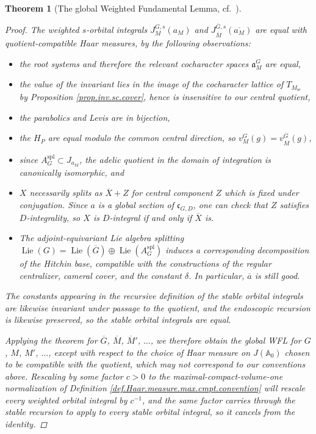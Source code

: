 \documentclass[openany]{amsbook}
\newtheorem{theorem}{Theorem}[chapter]
\theoremstyle{definition}
\theoremstyle{remark}
\numberwithin{equation}{section}
\newcommand{\A}{\mathbb{A}}
\newcommand{\ol}[1]{\overline{#1}}
\renewcommand{\-}{\operatorname{-}}
\renewcommand{\a}{\mathfrak{a}}
\newcommand{\on}[1]{\operatorname{#1}}
\renewcommand{\A}{\mathbb{A}}
\newcommand{\fc}{\mathfrak{c}}
\newcommand{\Lie}{\on{Lie}}
\newcommand{\spl}{\mathrm{spl}}
\renewcommand{\sc}{\mathrm{sc}}
\begin{document}
\begin{theorem}[{The global Weighted Fundamental Lemma, cf.\ \cite[Th\'eor\`eme 15.1.1]{CLII}}]
\begin{proof}
    The weighted $s$-orbital integrals $J^{G,s}_M(a_M)$ and $J^{\ol{G},s}_{\ol{M}}(\ol{a_M})$ are equal with quotient-compatible Haar measures, by the following observations: 
    \begin{itemize} 
    \item the root systems and therefore the relevant cocharacter spaces $\a_M^G$ are equal, 
    \item the value of the invariant lies in the image of the cocharacter lattice of $T_{M_{\sc}}$ by Proposition \ref{prop.inv.sc.cover}, hence is insensitive to our central quotient,
    \item the parabolics and Levis are in bijection, 
    \item the $H_P$ are equal modulo the common central direction, so $v_M^G(g) = v_{\ol{M}}^{\ol{G}}(g)$,
    \item since $A_G^{\spl} \subset J_{a_M}$, the adelic quotient in the domain of integration is canonically isomorphic, and
    \item $X$ necessarily splits as $\ol{X} + Z$ for central component $Z$ which is fixed under conjugation. Since $a$ is a global section of $\fc_{G,D}$, one can check that $Z$ satisfies $D$-integrality, so $X$ is $D$-integral if and only if $\ol{X}$ is.
    \item The adjoint-equivariant Lie algebra splitting $\Lie(G) = \Lie(\ol{G}) \oplus \Lie(A_G^{\spl})$ induces a corresponding decomposition of the Hitchin base, compatible with the constructions of the regular centralizer, cameral cover, and the constant $\delta$. In particular, $\ol{a}$ is still good. 
    \end{itemize}
    The constants appearing in the recursive definition of the stable orbital integrals are likewise invariant under passage to the quotient, and the endoscopic recursion is likewise preserved, so the stable orbital integrals are equal. 
    
    Applying the theorem for $\ol{G}$, $\ol{M}$, $\ol{M}'$, $\ldots$, we therefore obtain the global WFL for $G$, $M$, $M'$, $\ldots$, except with respect to the choice of Haar measure on $J(\A_0)$ chosen to be compatible with the \textit{quotient}, which may not correspond to our conventions above. Rescaling by some factor $c > 0$ to the maximal-compact-volume-one normalization of Definition \ref{def.Haar.measure.max.cmpt.convention} will rescale every weighted orbital integral by $c^{-1}$, and the same factor carries through the stable recursion to apply to every stable orbital integral, so it cancels from the identity.
\end{proof}
\end{theorem}
\end{document}
